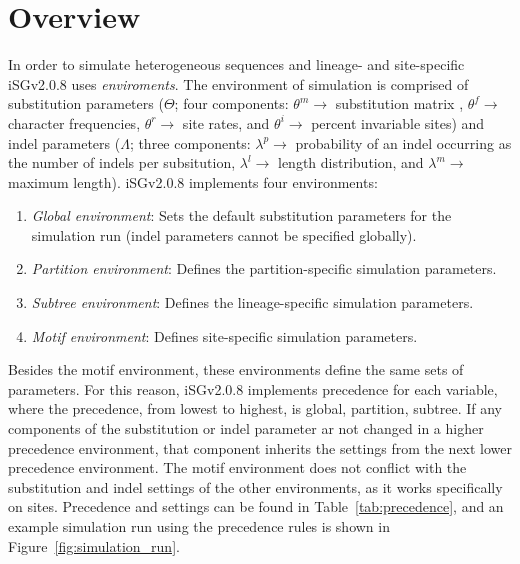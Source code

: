\documentclass[10pt]{article}
\newcommand{\version}{2.0.8 }
\newcommand{\iSGcurrentshort}{iSGv\version }
\begin{document}
\section{Overview}
\label{sec:overview}

In order to simulate heterogeneous sequences and lineage- and site-specific \iSGcurrentshort uses \textit{enviroments}. The environment of simulation is comprised of
substitution parameters ($\Theta$; four components: $\theta^m \rightarrow$ substitution matrix , $\theta^f \rightarrow$ character frequencies, $\theta^r \rightarrow$ site rates, and $\theta^i\rightarrow$ percent invariable sites) and indel parameters ($\Lambda$; three components: $\lambda^p \rightarrow$ probability of an indel occurring as the number of indels per subsitution, $\lambda^l\rightarrow$ length distribution, and $\lambda^m\rightarrow$ maximum length). \iSGcurrentshort implements four environments:

\begin{enumerate}
\item \textit{Global environment}: Sets the default substitution parameters for the simulation run (indel parameters cannot be specified globally).
\item \textit{Partition environment}: Defines the partition-specific simulation parameters.
\item \textit{Subtree environment}: Defines the lineage-specific simulation parameters.
\item \textit{Motif environment}: Defines site-specific simulation parameters.
\end{enumerate}

Besides the motif environment, these environments define the same sets of parameters. For this reason, \iSGcurrentshort implements precedence for each variable, where the precedence, from lowest to highest, is global, partition, subtree. If any components of the substitution or indel parameter ar not changed in a higher precedence environment, that component inherits the settings from the next lower precedence environment. The motif environment does not conflict with the substitution and indel settings of the other environments, as it works specifically on sites. Precedence and settings can be found in Table~\ref{tab:precedence}, and an example simulation run using the precedence rules is shown in Figure~\ref{fig:simulation_run}.
\end{document}

